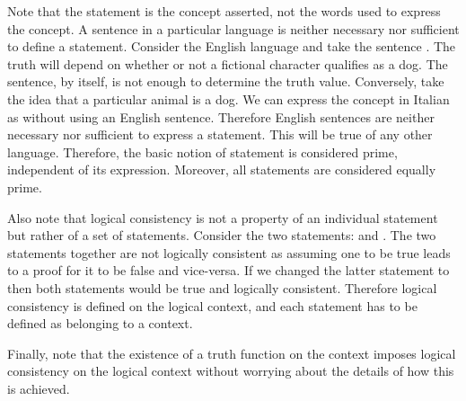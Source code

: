 \documentclass[11pt,letterpaper,fleqn]{memoir} %
\begin{document}
\begin{mathSection}
\begin{justification}
	Note that the statement is the concept asserted, not the words used to express the concept. A sentence in a particular language is neither necessary nor sufficient to define a statement. Consider the English language and take the sentence . The truth will depend on whether or not a fictional character qualifies as a dog. The sentence, by itself, is not enough to determine the truth value. Conversely, take the idea that a particular animal is a dog. We can express the concept in Italian as  without using an English sentence. Therefore English sentences are neither necessary nor sufficient to express a statement. This will be true of any other language. Therefore, the basic notion of statement is considered prime, 
	independent of its expression. Moreover, all statements are considered equally prime.
	
	Also note that logical consistency is not a property of an individual statement but rather of a set of statements. Consider the two statements:  and . The two statements together are not logically consistent as assuming one to be true leads to a proof for it to be false and vice-versa. If we changed the latter statement to  then both statements would be true and logically consistent. Therefore logical consistency is defined on the logical context, and each statement has to be defined as belonging to a context.
	
	Finally, note that the existence of a truth function on the context imposes logical consistency on the logical context without worrying about the details of how this is achieved.
	
\end{justification}

\end{mathSection}
\end{document}
